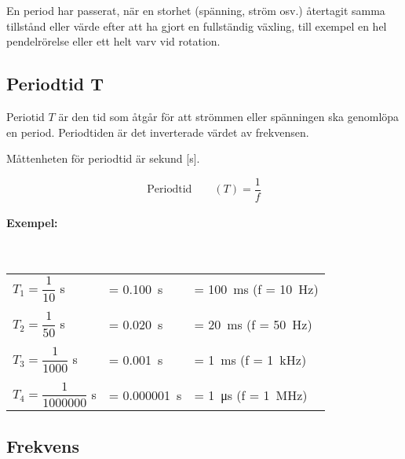 En period har passerat, när en storhet (spänning, ström osv.) återtagit samma
tillstånd eller värde efter att ha gjort en fullständig växling, till exempel en hel
pendelrörelse eller ett helt varv vid rotation.

\subsection{Periodtid T}

Periotid \(T\) är den tid som åtgår för att strömmen eller spänningen ska
genomlöpa en period. Periodtiden är det inverterade värdet av frekvensen.

Måttenheten för periodtid är sekund [s].

$$\text{Periodtid} \qquad (T) = \dfrac{1}{f}$$

\noindent

\paragraph{Exempel:}~\\[1ex]
\begin{small}
\begin{tabular}{@{}lll}
\(T_1=\dfrac{1}{10}\) s & = \SI{0,100}{\second} & = \SI{100}{\milli\second} (f = \SI{10}{\hertz})\\
\\
\(T_2=\dfrac{1}{50}\) s & = \SI{0,020}{\second} & = \SI{20}{\milli\second} (f = \SI{50}{\hertz})\\
\\
\(T_3=\dfrac{1}{1000}\) s & = \SI{0,001}{\second} & = \SI{1}{\milli\second} (f = \SI{1}{\kilo\hertz})\\
\\
\(T_4=\dfrac{1}{1000000}\) s & = \SI{0,000001}{\second} & = \SI{1}{\micro\second} (f = \SI{1}{\mega\hertz})\\
\end{tabular}
\end{small}

\subsection{Frekvens}

